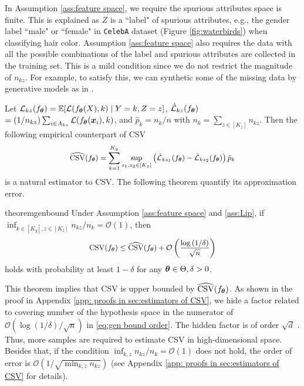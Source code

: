 \documentclass{article} %
\newcommand{\btheta}{\text{\boldmath{$\theta$}}}
\newcommand{\bx}{\boldsymbol{x}}
\newcommand{\mE}{\mathbb{E}}
\newcommand{\cL}{\mathcal{L}}
\newcommand{\cO}{\mathcal{O}}
\begin{document}
	In Assumption \ref{ass:feature space}, we require the spurious attributes space is finite. This is explained as $Z$ is a ``label" of spurious attributes, e.g., the gender label ``male" or ``female" in \texttt{CelebA} dataset (Figure \ref{fig:waterbirds}) when classifying hair color. Assumption \ref{ass:feature space} also requires the data with all the possible combinations of the label and spurious attributes are collected in the training set. This is a mild condition since we do not restrict the magnitude of $n_{kz}$. For example, to satisfy this, we can synthetic some of the missing data by generative models as in \citep{wang2022out,zhu2017unpaired}. 
	\par
	Let $\cL_{kz}(f_{\btheta}) = \mE[\cL(f_{\btheta}(X), k)\mid Y=k, Z=z]$, $\hat{\cL}_{kz}(f_{\btheta})$ $ = (1 / n_{kz})\sum_{i\in A_{kz}}\cL(f_{\btheta}(\bx_{i}), k)$, and $\hat{p}_{k} = n_{k} / n$ with $n_{k}=\sum_{z\in[K_{z}]}n_{kz}$. Then the following empirical counterpart of CSV 
	\begin{equation}\label{eq:empirical csv}
		\small
		\widehat{\rm{CSV}}(f_{\btheta}) = \sum\limits_{k = 1}^{K_{y}}\sup_{z_{1}, z_{2}\in[K_{z}]}\left(\hat{\cL}_{kz_{1}}(f_{\btheta}) - \hat{\cL}_{kz_{2}}(f_{\btheta})\right)\hat{p}_{k}
	\end{equation}
	is a natural estimator to CSV. The following theorem quantify its approximation error. 
	\begin{restatable}{theorem}{genbound}\label{thm:gen bound}
		Under Assumption \ref{ass:feature space} and \ref{ass:Lip}, if  $\inf_{k\in[K_{y}], z\in[K_{z}]} n_{kz} / n_{k} = \cO(1)$, then
		\begin{equation}\label{eq:gen bound order}
			\small
			\mathrm{CSV}(f_{\btheta}) \leq \widehat{\rm CSV}(f_{\btheta}) + \cO\left(\frac{\log{(1/\delta)}}{\sqrt{n}}\right) 
		\end{equation}
		holds with probability at least $1 - \delta$ for any $\btheta\in\Theta, \delta > 0$.
	\end{restatable}
	This theorem implies that CSV is upper bounded by $\widehat{\rm CSV}(f_{\btheta})$. As shown in the proof in Appendix \ref{app: proofs in sec:estimators of CSV}, we hide a factor related to covering number \citep{vershynin2018} of the hypothesis space in the numerator of $\cO\left(\log{(1/\delta)}/\sqrt{n}\right)$ in \eqref{eq:gen bound order}. The hidden factor is of order $\sqrt{d}$ \citep{wainwright2019}. Thus, more samples are required to estimate CSV in high-dimensional space. Besides that, if the condition $\inf_{k,z}n_{kz} / n_{k} = \cO(1)$ does not hold, the order of error is $\cO(1 / \sqrt{\min_{k, z}n_{kz}})$ (see Appendix \ref{app: proofs in sec:estimators of CSV} for details). 
	
\end{document}
